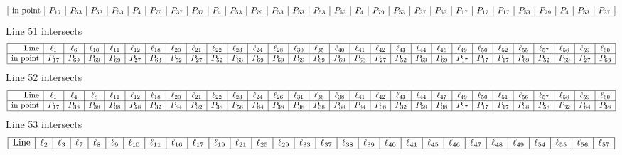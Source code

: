 \documentclass{article}
\begin{document}
{$$\begin{array}{|r*{28}{|c}|}
\hline
\mbox{in point}  & P_{17} & P_{53} & P_{53} & P_{53} & P_{4} & P_{79} & P_{37} & P_{37} & P_{4} & P_{53} & P_{79} & P_{53} & P_{53} & P_{53} & P_{53} & P_{4} & P_{79} & P_{53} & P_{37} & P_{53} & P_{17} & P_{17} & P_{17} & P_{53} & P_{79} & P_{4} & P_{53} & P_{37}\\
\hline
\end{array}
$$
Line 51 intersects 
$$
\begin{array}{|r*{28}{|c}|}
\hline
\mbox{Line}  & \ell_{1} & \ell_{6} & \ell_{10} & \ell_{11} & \ell_{12} & \ell_{18} & \ell_{20} & \ell_{21} & \ell_{22} & \ell_{23} & \ell_{24} & \ell_{28} & \ell_{30} & \ell_{35} & \ell_{40} & \ell_{41} & \ell_{42} & \ell_{43} & \ell_{44} & \ell_{46} & \ell_{49} & \ell_{50} & \ell_{52} & \ell_{55} & \ell_{57} & \ell_{58} & \ell_{59} & \ell_{60}\\
\hline
\mbox{in point}  & P_{17} & P_{69} & P_{69} & P_{69} & P_{27} & P_{63} & P_{52} & P_{27} & P_{52} & P_{63} & P_{69} & P_{69} & P_{69} & P_{69} & P_{69} & P_{63} & P_{27} & P_{52} & P_{69} & P_{69} & P_{17} & P_{17} & P_{17} & P_{69} & P_{52} & P_{69} & P_{27} & P_{63}\\
\hline
\end{array}
$$
Line 52 intersects 
$$
\begin{array}{|r*{28}{|c}|}
\hline
\mbox{Line}  & \ell_{1} & \ell_{4} & \ell_{8} & \ell_{11} & \ell_{12} & \ell_{18} & \ell_{20} & \ell_{21} & \ell_{22} & \ell_{23} & \ell_{24} & \ell_{26} & \ell_{31} & \ell_{36} & \ell_{38} & \ell_{41} & \ell_{42} & \ell_{43} & \ell_{44} & \ell_{47} & \ell_{49} & \ell_{50} & \ell_{51} & \ell_{56} & \ell_{57} & \ell_{58} & \ell_{59} & \ell_{60}\\
\hline
\mbox{in point}  & P_{17} & P_{38} & P_{38} & P_{38} & P_{58} & P_{32} & P_{84} & P_{32} & P_{38} & P_{58} & P_{84} & P_{38} & P_{38} & P_{38} & P_{38} & P_{84} & P_{38} & P_{32} & P_{58} & P_{38} & P_{17} & P_{17} & P_{17} & P_{38} & P_{58} & P_{32} & P_{84} & P_{38}\\
\hline
\end{array}
$$
Line 53 intersects 
$$
\begin{array}{|r*{28}{|c}|}
\hline
\mbox{Line}  & \ell_{2} & \ell_{3} & \ell_{7} & \ell_{8} & \ell_{9} & \ell_{10} & \ell_{11} & \ell_{16} & \ell_{17} & \ell_{19} & \ell_{21} & \ell_{25} & \ell_{29} & \ell_{33} & \ell_{37} & \ell_{38} & \ell_{39} & \ell_{40} & \ell_{41} & \ell_{45} & \ell_{46} & \ell_{47} & \ell_{48} & \ell_{49} & \ell_{54} & \ell_{55} & \ell_{56} & \ell_{57}\\
\hline

\end{array}$$}
\end{document}
